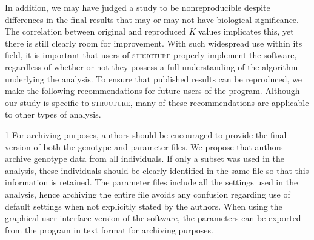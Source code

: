 In addition, we may have judged a study to be nonreproducible despite differences in the final results that may or may not have biological significance. The correlation between original and reproduced \emph{K} values implicates this, yet there is still clearly room for improvement. With such widespread use within its field, it is important that users of \textsc{structure} properly implement the software, regardless of whether or not they possess a full understanding of the algorithm underlying the analysis. To ensure that published results can be reproduced, we make the following recommendations for future users of the program. Although our study is specific to \textsc{structure}, many of these recommendations are applicable to other types of analysis.

1 For archiving purposes, authors should be encouraged to provide the final version of both the genotype and parameter files. We propose that authors archive genotype data from all individuals. If only a subset was used in the analysis, these individuals should be clearly identified in the same file so that this information is retained. The parameter files include all the settings used in the analysis, hence archiving the entire file avoids any confusion regarding use of default settings when not explicitly stated by the authors. When using the graphical user interface version of the software, the parameters can be exported from the program in text format for archiving purposes.

